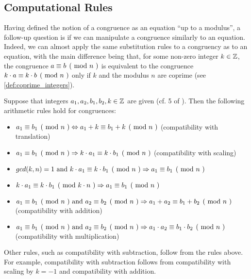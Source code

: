 \subsection{Computational Rules} Having defined the notion of a congruence as an equation ``up to a modulus'', a follow-up question is if we can manipulate a congruence similarly to an equation. Indeed, we can almost apply the same substitution rules to a congruency as to an equation, with the main difference being that, for some non-zero integer $k\in \mathbb{Z}$, the congruence $\kongru{a}{b}{n}$ is equivalent to the congruence $\kongru{k\cdot a}{k\cdot b}{n}$ only if $k$ and the modulus $n$ are coprime (see \ref{def:coprime_integers}). 

Suppose that integers $a_1,a_2,b_1,b_2, k\in\mathbb{Z}$ are given (cf. \chaptname{} 5 of \cite{hardy-2008}). Then the following arithmetic rules hold for congruences:
\begin{itemize}
\label{def:modular_arithmetic_rules}
\item $\kongru{a_1}{b_1}{n}\Leftrightarrow \kongru{a_1+k}{b_1+k}{n}$ (compatibility with translation)
\item $\kongru{a_1}{b_1}{n}\Rightarrow\kongru{k\cdot a_1}{k\cdot b_1}{n}$ (compatibility with scaling)
\item $gcd(k,n)=1 \text{ and } \kongru{k\cdot a_1}{k\cdot b_1}{n}\Rightarrow \kongru{a_1}{b_1}{n}$
\item $\kongru{k\cdot a_1}{k\cdot b_1}{k\cdot n}\Rightarrow\kongru{a_1}{b_1}{n}$
\item $\kongru{a_1}{b_1}{n}\text{ and } \kongru{a_2}{b_2}{n}\Rightarrow \kongru{a_1+a_2}{b_1+b_2}{n}$ (compatibility with addition)
\item $\kongru{a_1}{b_1}{n}\text{ and } \kongru{a_2}{b_2}{n}\Rightarrow\kongru{a_1\cdot a_2}{b_1\cdot b_2}{n}$ (compatibility with multiplication)
\end{itemize}
Other rules, such as compatibility with subtraction, follow from the rules above. For example, compatibility with subtraction follows from compatibility with scaling by $k=-1$ and compatibility with addition.

